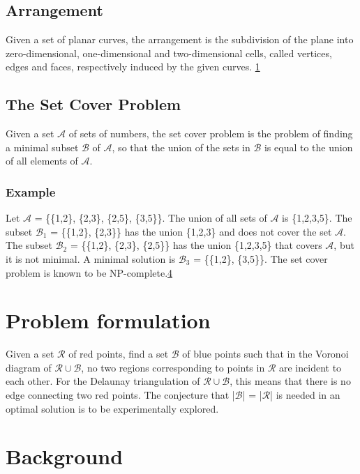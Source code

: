 \documentclass[a4paper,12pt]{article}
\begin{document}
\subsection{Arrangement}
\label{sec:arrangement}
Given a set of planar curves, the arrangement is the subdivision of the plane into zero-dimensional, one-dimensional and two-dimensional cells, called vertices, edges and faces, respectively induced by the given curves. \hyperref[ref:cgal]{1}

\subsection{The Set Cover Problem}
Given a set $\mathcal A$ of sets of numbers, the set cover problem is the problem of finding a minimal subset $\mathcal B$ of $\mathcal A$, so that the union of the sets in $\mathcal B$ is equal to the union of all elements of $\mathcal A$.

\subsubsection{Example}
Let $\mathcal A$ =  \{\{1,2\}, \{2,3\}, \{2,5\}, \{3,5\}\}. The union of all sets of $\mathcal A$ is \{1,2,3,5\}. \newline
The subset $\mathcal B_1$ = \{\{1,2\}, \{2,3\}\} has the union \{1,2,3\} and does not cover the set $\mathcal A$. \newline
The subset $\mathcal B_2$ = \{\{1,2\}, \{2,3\}, \{2,5\}\} has the union \{1,2,3,5\} that covers $\mathcal A$, but it is not minimal. \newline
A minimal solution is $\mathcal B_3$ = \{\{1,2\}, \{3,5\}\}. \newline
The set cover problem is known to be NP-complete.\hyperref[ref:karp]{4}
\section{Problem formulation}
Given a set $\mathcal{R}$ of red points, find a set $\mathcal{B}$ of blue points such that in the Voronoi diagram of $\mathcal{R} \cup \mathcal{B}$, no two regions corresponding to points in $\mathcal{R}$ are incident to each other. For the Delaunay triangulation of $\mathcal{R} \cup \mathcal{B}$, this means that there is no edge connecting two red points. The conjecture that |$\mathcal{B}$| = |$\mathcal{R}$| is needed in an optimal solution is to be experimentally explored.


\section{Background}
\end{document}
